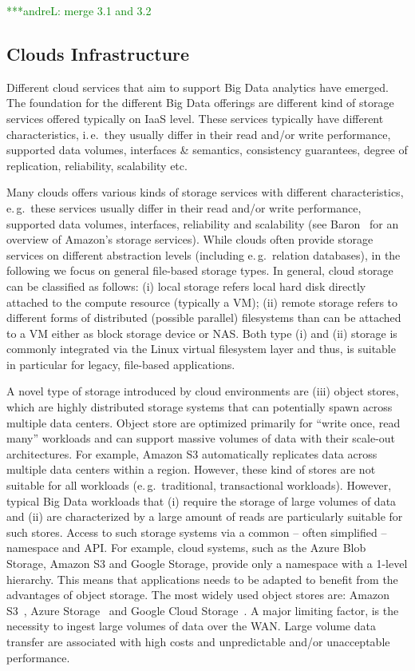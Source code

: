 \documentclass[times]{cpeauth}
\newcommand{\alnote}[1]{ {\textcolor{green} { ***andreL: #1 }}}
\newcommand{\alnote}[1]{}
\begin{document}
\alnote{merge 3.1 and 3.2}
\subsection{Clouds Infrastructure}

Different cloud services that aim to support Big Data analytics have emerged.
The foundation for the different Big Data offerings are different kind of
storage services offered typically on IaaS level. These services typically
have different characteristics, i.\,e.\ they usually differ in their read
and/or write performance, supported data volumes, interfaces \& semantics,
consistency guarantees, degree of replication, reliability, scalability etc.


Many clouds offers various kinds of storage services with different
characteristics, e.\,g.\ these services usually differ in their read
and/or write performance, supported data volumes, interfaces,
reliability and scalability (see Baron~\cite{baron2010} for an
overview of Amazon's storage services). While clouds often provide
storage services on different abstraction levels (including e.\,g.\
relation databases), in the following we focus on general file-based
storage types. In general, cloud storage can be classified as follows:
(i) local storage refers local hard disk directly attached to the
compute resource (typically a VM); (ii) remote storage refers to
different forms of distributed (possible parallel) filesystems than
can be attached to a VM either as block storage device or NAS. Both
type (i) and (ii) storage is commonly integrated via the Linux virtual
filesystem layer and thus, is suitable in particular for legacy,
file-based applications.

A novel type of storage introduced by cloud environments are (iii)
object stores, which are highly distributed storage systems that can
potentially spawn across multiple data centers. Object store are
optimized primarily for ``write once, read many'' workloads and can
support massive volumes of data with their scale-out
architectures. For example, Amazon S3 automatically replicates data
across multiple data centers within a region. However, these kind of
stores are not suitable for all workloads (e.\,g.\ traditional,
transactional workloads). However, typical Big Data workloads that (i)
require the storage of large volumes of data and (ii) are
characterized by a large amount of reads are particularly suitable for
such stores. Access to such storage systems via a common -- often
simplified -- namespace and API. For example, cloud systems, such as
the Azure Blob Storage, Amazon S3 and Google Storage, provide only a
namespace with a 1-level hierarchy. This means that applications needs
to be adapted to benefit from the advantages of object storage. The
most widely used object stores are: Amazon S3~\cite{amazons3}, Azure
Storage~\cite{azure-blob-storage} and Google Cloud
Storage~\cite{google-storage}. A major limiting factor, is the
necessity to ingest large volumes of data over the WAN. Large volume
data transfer are associated with high costs and unpredictable and/or
unacceptable performance.
\end{document}
